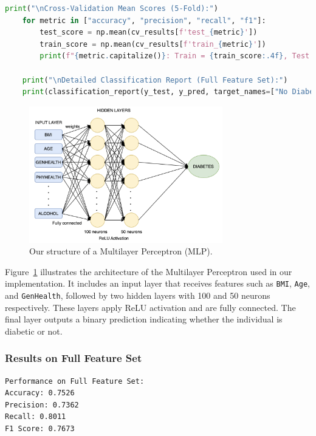 \begin{lstlisting}[language=Python, label={lst:mlp_classifier}]
    print("\nCross-Validation Mean Scores (5-Fold):")
    for metric in ["accuracy", "precision", "recall", "f1"]:
        test_score = np.mean(cv_results[f'test_{metric}'])
        train_score = np.mean(cv_results[f'train_{metric}'])
        print(f"{metric.capitalize()}: Train = {train_score:.4f}, Test = {test_score:.4f}")
    
    print("\nDetailed Classification Report (Full Feature Set):")
    print(classification_report(y_test, y_pred, target_names=["No Diabetes", "Diabetes"]))
    \end{lstlisting}
    
\begin{figure}[H]
    \centering
    \includegraphics[width=0.75\textwidth]{images/our-mlp-diagram.png} %
    \caption{Our structure of a Multilayer Perceptron (MLP).}
    \label{fig:mlp-arch}
\end{figure}

\vspace{0.5em}

\noindent
Figure~\ref{fig:mlp-arch} illustrates the architecture of the Multilayer Perceptron used in our implementation. It includes an input layer that receives features such as \texttt{BMI}, \texttt{Age}, and \texttt{GenHealth}, followed by two hidden layers with 100 and 50 neurons respectively. These layers apply ReLU activation and are fully connected. The final layer outputs a binary prediction indicating whether the individual is diabetic or not.


\subsubsection{Results on Full Feature Set}

\begin{verbatim}
Performance on Full Feature Set:
Accuracy: 0.7526
Precision: 0.7362
Recall: 0.8011
F1 Score: 0.7673
\end{verbatim}

